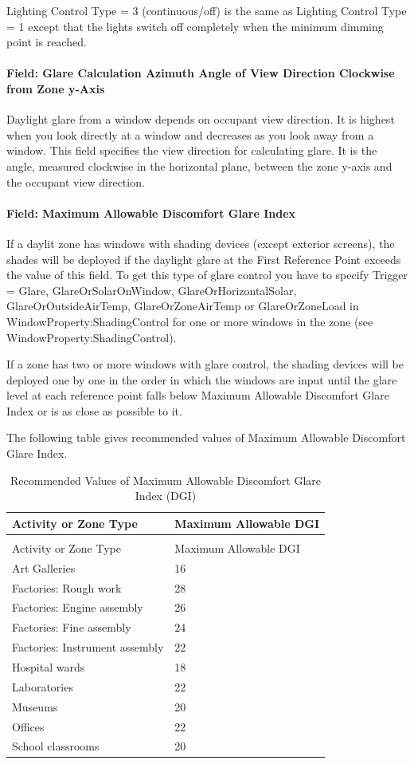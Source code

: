 Lighting Control Type = 3 (continuous/off) is the same as Lighting Control Type = 1 except that the lights switch off completely when the minimum dimming point is reached.

\paragraph{Field: Glare Calculation Azimuth Angle of View Direction Clockwise from Zone y-Axis}\label{field-glare-calculation-azimuth-angle-of-view-direction-clockwise-from-zone-y-axis}

Daylight glare from a window depends on occupant view direction. It is highest when you look directly at a window and decreases as you look away from a window. This field specifies the view direction for calculating glare. It is the angle, measured clockwise in the horizontal plane, between the zone y-axis and the occupant view direction.

\paragraph{Field: Maximum Allowable Discomfort Glare Index}\label{field-maximum-allowable-discomfort-glare-index}

If a daylit zone has windows with shading devices (except exterior screens), the shades will be deployed if the daylight glare at the First Reference Point exceeds the value of this field. To get this type of glare control you have to specify Trigger = Glare, GlareOrSolarOnWindow, GlareOrHorizontalSolar, GlareOrOutsideAirTemp, GlareOrZoneAirTemp or GlareOrZoneLoad in WindowProperty:ShadingControl for one or more windows in the zone (see WindowProperty:ShadingControl).

If a zone has two or more windows with glare control, the shading devices will be deployed one by one in the order in which the windows are input until the glare level at each reference point falls below Maximum Allowable Discomfort Glare Index or is as close as possible to it.

The following table gives recommended values of Maximum Allowable Discomfort Glare Index.

\begin{longtable}[c]{@{}ll@{}}
\caption{Recommended Values of Maximum Allowable Discomfort Glare Index (DGI) \label{table:recommended-values-discomfort-glare-index}} \tabularnewline
\toprule 
Activity or Zone Type & Maximum Allowable DGI \tabularnewline
\midrule
\endfirsthead

\caption[]{Recommended Values of Maximum Allowable Discomfort Glare Index (DGI)} \tabularnewline
\toprule 
Activity or Zone Type & Maximum Allowable DGI \tabularnewline
\midrule
\endhead

Art Galleries & 16 \tabularnewline
Factories: Rough work & 28 \tabularnewline
Factories: Engine assembly & 26 \tabularnewline
Factories: Fine assembly & 24 \tabularnewline
Factories: Instrument assembly & 22 \tabularnewline
Hospital wards & 18 \tabularnewline
Laboratories & 22 \tabularnewline
Museums & 20 \tabularnewline
Offices & 22 \tabularnewline
School classrooms & 20 \tabularnewline
\bottomrule
\end{longtable}

